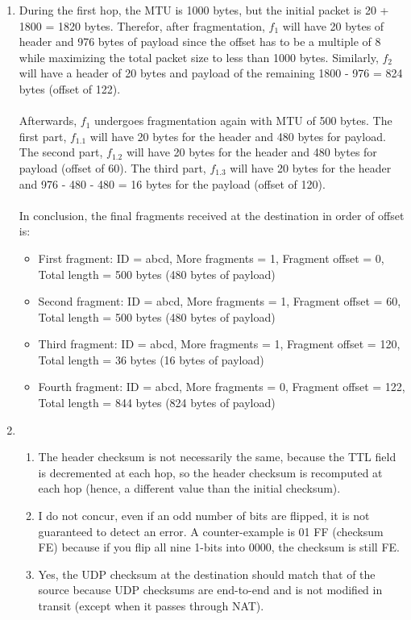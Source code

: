 \documentclass[12pt]{article}
\begin{document}
\begin{enumerate}
	\item %
	During the first hop, the MTU is 1000 bytes, but the initial packet is 20 + 1800 = 1820 bytes. Therefor, after fragmentation, $f_1$ will have 20 bytes of header and 976 bytes of payload since the offset has to be a multiple of 8 while maximizing the total packet size to less than 1000 bytes.  Similarly, $f_2$ will have a header of 20 bytes and payload of the remaining 1800 - 976 = 824 bytes (offset of 122). \\ \\ Afterwards, $f_1$ undergoes fragmentation again with MTU of 500 bytes. The first part, $f_1.1$ will have 20 bytes for the header and 480 bytes for payload. The second part, $f_1.2$ will have 20 bytes for the header and 480 bytes for payload (offset of 60). The third part, $f_1.3$ will have 20 bytes for the header and 976 - 480 - 480 = 16 bytes for the payload (offset of 120). \\ \\ In conclusion, the final fragments received at the destination in order of offset is:
	\begin{itemize}
		\item First fragment: ID = abcd, More fragments = 1, Fragment offset = 0, Total length = 500 bytes (480 bytes of payload)
		\item Second fragment: ID = abcd, More fragments = 1, Fragment offset = 60, Total length = 500 bytes (480 bytes of payload)
		\item Third fragment: ID = abcd, More fragments = 1, Fragment offset = 120, Total length = 36 bytes (16 bytes of payload)
		\item Fourth fragment: ID = abcd, More fragments = 0, Fragment offset = 122, Total length = 844 bytes (824 bytes of payload)
	\end{itemize}
	\item %
	\begin{enumerate}
		\item The header checksum is not necessarily the same, because the TTL field is decremented at each hop, so the header checksum is recomputed at each hop (hence, a different value than the initial checksum).
		\item I do not concur, even if an odd number of bits are flipped, it is not guaranteed to detect an error. A counter-example is 01 FF (checksum FE) because if you flip all nine 1-bits into 0000, the checksum is still FE.
		\item Yes, the UDP checksum at the destination should match that of the source because UDP checksums are end-to-end and is not modified in transit (except when it passes through NAT). 

\end{enumerate}
\end{enumerate}
\end{document}
